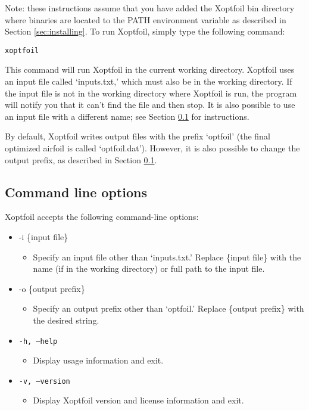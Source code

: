 \documentclass[11pt]{article}
\begin{document}
Note: these instructions assume that you have added the Xoptfoil bin directory where 
binaries are
located to the PATH environment variable as described in Section \ref{sec:installing}.
To run Xoptfoil, simply type the following command:

\begin{verbatim}
xoptfoil
\end{verbatim}

\noindent This command will run Xoptfoil in the current working
directory.  Xoptfoil uses an input file called `inputs.txt,' which must also be in the
working directory.  If the input file is not in the working directory where Xoptfoil is
run, the program will notify you that it can't find the file and then stop. It is also
possible
to use an input file with a different name; see Section \ref{sec:CLOs} for instructions.

By default, Xoptfoil writes output files with the prefix `optfoil' (the final optimized
airfoil is called `optfoil.dat'). However, it is also possible to change the output
prefix, as described in Section \ref{sec:CLOs}.

\subsection{Command line options}\label{sec:CLOs}

Xoptfoil accepts the following command-line options:

\begin{itemize}
  \item{-i \{input file\}
  \begin{itemize}
    \item{Specify an input file other than `inputs.txt.' Replace \{input file\} with the
          name (if in the working directory) or full path to the input file.}
  \end{itemize}}
  \item{-o \{output prefix\}
  \begin{itemize}
    \item{Specify an output prefix other than `optfoil.' Replace \{output prefix\} with the
          desired string.}
  \end{itemize}}
  \item{\texttt{-h, --help}
  \begin{itemize}
    \item{Display usage information and exit.}
  \end{itemize}}
  \item{\texttt{-v, --version}
  \begin{itemize}
    \item{Display Xoptfoil version and license information and exit.}
  \end{itemize}}
\end{itemize}
\end{document}
